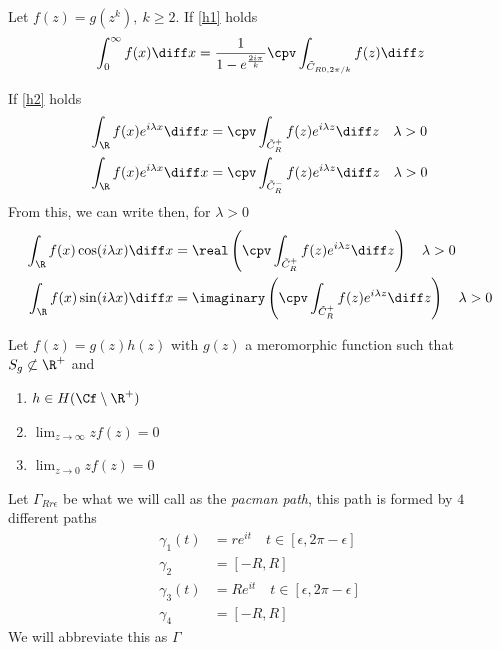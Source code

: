 \documentclass[../mmf.tex]{subfiles}
\begin{document}
\begin{thm}
	Let $f(z)=g(z^k),\ k\ge2$. If \eqref{h1} holds
	\begin{equation}
		\int_{0}^{\infty}f(x)\diff x=\frac{1}{1-e^{\frac{2i\pi}{k}}}\cpv\int_{\tilde{C}_{R0,2\pi/k}}^{}f(z)\diff z
		\label{eq:powerint}
	\end{equation}
\end{thm}
\begin{thm}
	If \eqref{h2} holds
	\begin{equation}
		\begin{aligned}
			\int_{\R}^{}f(x)e^{i\lambda x}\diff x&=\cpv\int_{\tilde{C}_R^+}f(z)e^{i\lambda z}\diff z\quad\lambda>0\\
			\int_{\R}^{}f(x)e^{i\lambda x}\diff x&=\cpv\int_{\tilde{C}_R^-}f(z)e^{i\lambda z}\diff z\quad\lambda>0
		\end{aligned}
		\label{eq:fourierint}
	\end{equation}
	From this, we can write then, for $\lambda>0$
	\begin{equation}
		\begin{aligned}
			\int_{\R}^{}f(x)\cos(i\lambda x)\diff x&=\real\left(\cpv\int_{\tilde{C}_R^+}f(z)e^{i\lambda z}\diff z\right)\quad\lambda>0\\
			\int_{\R}^{}f(x)\sin(i\lambda x)\diff x&=\imaginary\left(\cpv\int_{\tilde{C}_R^+}f(z)e^{i\lambda z}\diff z\right)\quad\lambda>0\\
		\end{aligned}
		\label{eq:trigpos}
	\end{equation}
\end{thm}
\begin{hyp}
	Let $f(z)=g(z)h(z)$ with $g(z)$ a meromorphic function such that $S_g\not\subset\R^+$ and
	\begin{enumerate}
	\item $h\in H(\Cf\setminus\R^+)$
	\item $\lim_{z\to\infty}zf(z)=0$
	\item $\lim_{z\to0}zf(z)=0$
	\end{enumerate}
	\label{h3}
\end{hyp}
\begin{dfn}
	Let $\Gamma_{Rr\epsilon}$ be what we will call as the \textit{pacman path}, this path is formed by $4$ different paths\\
	\begin{equation}
		\begin{aligned}
			\gamma_1(t)&=re^{it}\quad t\in[\epsilon,2\pi-\epsilon]\\
			\gamma_2&=[-R,R]\\
			\gamma_3(t)&=Re^{it}\quad t\in[\epsilon,2\pi-\epsilon]\\
			\gamma_4&=[-R,R]
		\end{aligned}
		\label{eq:pacmanpath}
	\end{equation}
	We will abbreviate this as $\Gamma$
\end{dfn}
\end{document}
